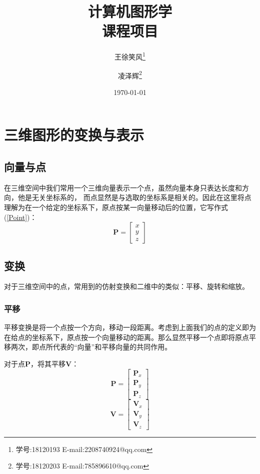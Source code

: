 \documentclass[12pt,oneside,a4paper]{ctexart}
\begin{document}

\title{计算机图形学 \\ 课程项目}
\author{ 王徐笑风\thanks{学号:18120193 E-mail:2208740924@qq.com}
	\and 凌泽辉\thanks{学号:18120203 E-mail:785896610@qq.com}}
\date{\today}
\maketitle
\newpage
\tableofcontents
\newpage
\section{三维图形的变换与表示}
\subsection{向量与点}
在三维空间中我们常用一个三维向量表示一个点，虽然向量本身只表达长度和方向，他是无关坐标系的，
而点显然是与选取的坐标系是相关的。因此在这里将点理解为在一个给定的坐标系下，原点按某一向量移动后的位置，它写作式(\ref{Point})：
\begin{equation}
	\mathbf{P} = \begin{bmatrix}
		x \\
		y \\
		z
	\end{bmatrix}
	\label{Point}
\end{equation}
\subsection{变换}
对于三维空间中的点，常用到的仿射变换和二维中的类似：平移、旋转和缩放。
\subsubsection{平移}
平移变换是将一个点按一个方向，移动一段距离。考虑到上面我们的点的定义即为在给点的坐标系下，原点按一个向量移动的距离。那么显然平移一个点即将原点平移两次，即点所代表的“向量”和平移向量的共同作用。

对于点$\mathbf{P}$，将其平移$\mathbf{V}$：
\begin{equation*}
	\mathbf{P}=
	\begin{bmatrix}
		\mathbf{P}_x \\
		\mathbf{P}_y \\
		\mathbf{P}_z
	\end{bmatrix}
\end{equation*}
\begin{equation*}
	\mathbf{V}=
	\begin{bmatrix}
		\mathbf{V}_x \\
		\mathbf{V}_y \\
		\mathbf{V}_z
	\end{bmatrix}
\end{equation*}
\end{document}
